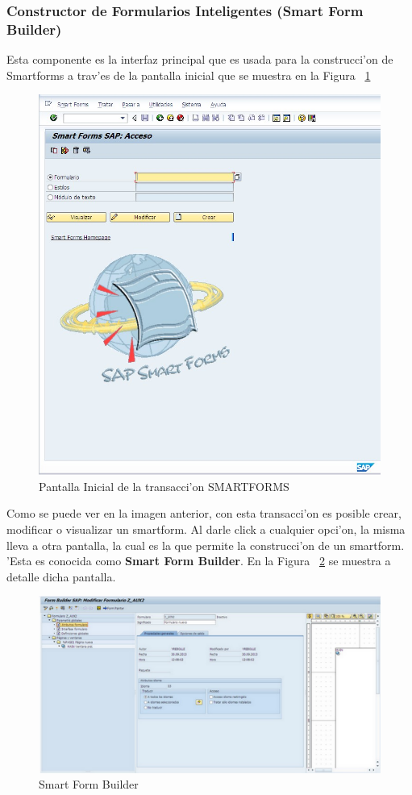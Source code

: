 \subsubsection{Constructor de Formularios Inteligentes (Smart Form Builder)}
	Esta componente es la interfaz principal que es usada para la construcci'on de Smartforms a trav'es de la pantalla inicial que se muestra en la Figura ~\ref{fig:smartforms1}
\begin{figure}[H]
\centering
\includegraphics[scale=0.65,type=jpg,ext=.jpg,read=.jpg]{figures/sm_initial}
\caption{Pantalla Inicial de la transacci'on SMARTFORMS}
\label{fig:smartforms1}
\end{figure}
Como se puede ver en la imagen anterior, con esta transacci'on es posible crear, modificar o visualizar un smartform. Al darle click a cualquier opci'on, la misma lleva a otra pantalla, la cual es la que permite la construcci'on de un smartform. 'Esta es conocida como \textbf{Smart Form Builder}. En la Figura ~\ref{fig:builder} se muestra a detalle dicha pantalla.
\begin{figure}[H]
\centering
\includegraphics[scale=0.65,type=jpg,ext=.jpg,read=.jpg]{figures/builder}
\caption{Smart Form Builder}
\label{fig:builder}
\end{figure}
